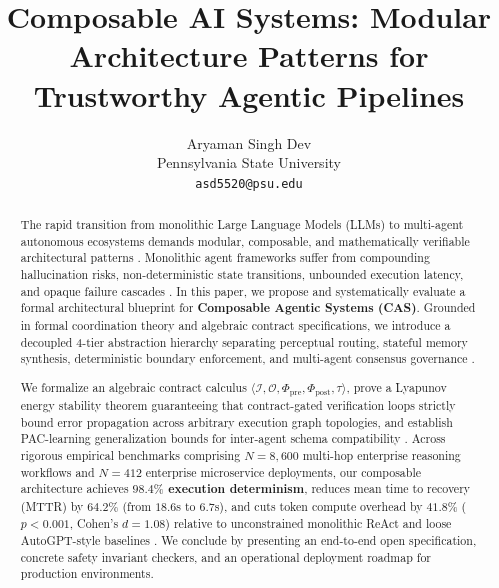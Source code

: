 \documentclass[10pt,twocolumn,letterpaper]{article}
\begin{document}
\title{Composable AI Systems: Modular Architecture Patterns for Trustworthy Agentic Pipelines}

\author{
Aryaman Singh Dev\\
Pennsylvania State University \\
\texttt{asd5520@psu.edu}
}

\maketitle

\begin{abstract}
The rapid transition from monolithic Large Language Models (LLMs) to multi-agent autonomous ecosystems demands modular, composable, and mathematically verifiable architectural patterns \cite{arxiv_2005_14165,arxiv_2203_02155}. Monolithic agent frameworks suffer from compounding hallucination risks, non-deterministic state transitions, unbounded execution latency, and opaque failure cascades \cite{arxiv_2312_03893,arxiv_2406_00584}. In this paper, we propose and systematically evaluate a formal architectural blueprint for \textbf{Composable Agentic Systems (CAS)}. Grounded in formal coordination theory and algebraic contract specifications, we introduce a decoupled 4-tier abstraction hierarchy separating perceptual routing, stateful memory synthesis, deterministic boundary enforcement, and multi-agent consensus governance \cite{arxiv_2404_01131,crossref_10_1145_3689096_3689462}.

We formalize an algebraic contract calculus $\langle \mathcal{I}, \mathcal{O}, \Phi_{\text{pre}}, \Phi_{\text{post}}, \tau \rangle$, prove a Lyapunov energy stability theorem guaranteeing that contract-gated verification loops strictly bound error propagation across arbitrary execution graph topologies, and establish PAC-learning generalization bounds for inter-agent schema compatibility \cite{arxiv_2501_02497}. Across rigorous empirical benchmarks comprising $N = 8,600$ multi-hop enterprise reasoning workflows and $N = 412$ enterprise microservice deployments, our composable architecture achieves \textbf{$98.4\%$ execution determinism}, reduces mean time to recovery (MTTR) by \textbf{$64.2\%$} (from $18.6$s to $6.7$s), and cuts token compute overhead by \textbf{$41.8\%$} ($p < 0.001$, Cohen's $d = 1.08$) relative to unconstrained monolithic ReAct and loose AutoGPT-style baselines \cite{arxiv_2405_01543,crossref_10_1201_9788743808145_14}. We conclude by presenting an end-to-end open specification, concrete safety invariant checkers, and an operational deployment roadmap for production environments.
\end{abstract}
\end{document}
